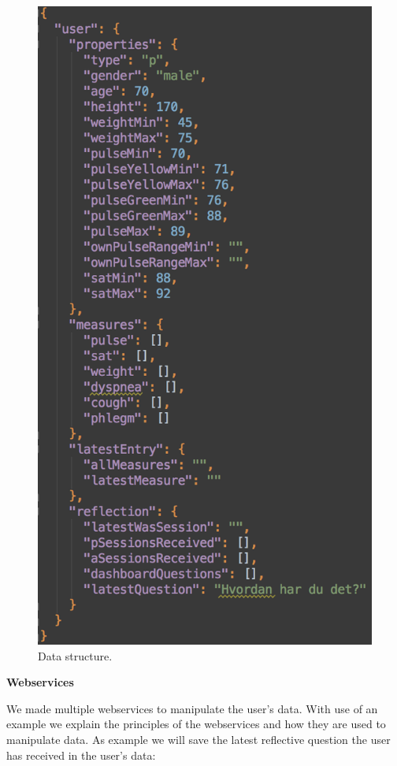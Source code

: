\begin{figure}[h]
\centering
\includegraphics[scale=0.5]{images/implementation/dataStructure.png}
\caption{Data structure.}
\label{fig:dStructure}
\end{figure}

\textbf{Webservices}

We made multiple webservices to manipulate the user's data. With use of an example we explain the principles of the webservices and how they are used to manipulate data. As example we will save the latest reflective question the user has received in the user's data:

